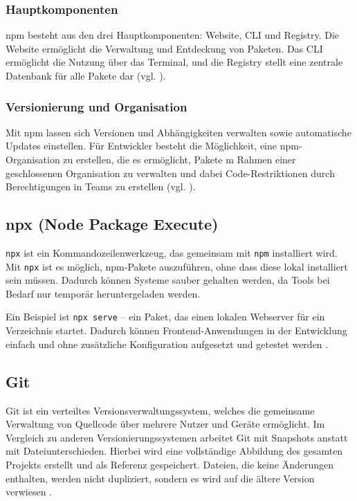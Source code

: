 \documentclass[oneside]{ausarbeitung}
\begin{document}
\subsubsection{Hauptkomponenten}
npm besteht aus den drei Hauptkomponenten: Website, \ac{CLI} und Registry. Die Website ermöglicht die Verwaltung und Entdeckung von Paketen. Das \ac{CLI} ermöglicht die Nutzung über das Terminal, und die Registry stellt eine zentrale Datenbank für alle Pakete dar (vgl. \parencite{npm}).

\subsubsection{Versionierung und Organisation}
Mit npm lassen sich Versionen und Abhängigkeiten verwalten sowie automatische Updates einstellen. Für Entwickler besteht die Möglichkeit, eine npm-Organisation zu erstellen, die es ermöglicht, Pakete m Rahmen einer geschlossenen Organisation zu verwalten und dabei Code-Restriktionen durch Berechtigungen in Teams zu erstellen (vgl. \parencite{npm}).

\subsection{npx (Node Package Execute)}

\texttt{npx} ist ein Kommandozeilenwerkzeug, das gemeinsam mit \texttt{npm} installiert wird. Mit \texttt{npx} ist es möglich, npm-Pakete auszuführen, ohne dass diese lokal installiert sein müssen. Dadurch können Systeme sauber gehalten werden, da Tools bei Bedarf nur temporär heruntergeladen werden.  

Ein Beispiel ist \texttt{npx serve} – ein Paket, das einen lokalen Webserver für ein Verzeichnis startet. Dadurch können Frontend-Anwendungen in der Entwicklung einfach und ohne zusätzliche Konfiguration aufgesetzt und getestet werden \parencite{npx-docs}.  

\subsection{Git}

Git ist ein verteiltes Versionsverwaltungssystem, welches die gemeinsame Verwaltung von Quellcode über mehrere Nutzer und Geräte ermöglicht. Im Vergleich zu anderen Versionierungssystemen arbeitet Git mit Snapshots anstatt mit Dateiunterschieden. Hierbei wird eine vollständige Abbildung des gesamten Projekts erstellt und als Referenz gespeichert. Dateien, die keine Änderungen enthalten, werden nicht dupliziert, sondern es wird auf die ältere Version verwiesen \parencite{git_intro}.
\end{document}
